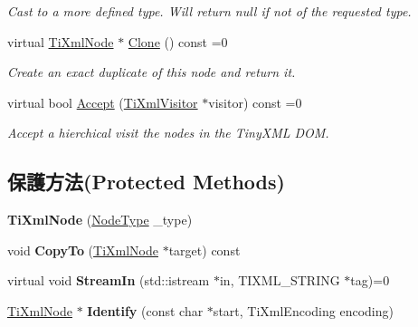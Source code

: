 \begin{DoxyCompactItemize}
\begin{DoxyCompactList}\small\item\em Cast to a more defined type. Will return null if not of the requested type. \end{DoxyCompactList}\item 
virtual \hyperlink{class_ti_xml_node}{Ti\+Xml\+Node} $\ast$ \hyperlink{class_ti_xml_node_abdbb27ef509ba1c5172cbc39fdcb263b}{Clone} () const  =0
\begin{DoxyCompactList}\small\item\em Create an exact duplicate of this node and return it. \end{DoxyCompactList}\item 
virtual bool \hyperlink{class_ti_xml_node_adb1f7da895f8c9e945e6bd406fe34c78}{Accept} (\hyperlink{class_ti_xml_visitor}{Ti\+Xml\+Visitor} $\ast$visitor) const  =0
\begin{DoxyCompactList}\small\item\em Accept a hierchical visit the nodes in the Tiny\+X\+ML D\+OM. \end{DoxyCompactList}\end{DoxyCompactItemize}
\subsection*{保護方法(Protected Methods)}
\begin{DoxyCompactItemize}
\item 
{\bfseries Ti\+Xml\+Node} (\hyperlink{class_ti_xml_node_a836eded4920ab9e9ef28496f48cd95a2}{Node\+Type} \+\_\+type)\hypertarget{class_ti_xml_node_a3f46721695868667113c7487ff123f20}{}\label{class_ti_xml_node_a3f46721695868667113c7487ff123f20}

\item 
void {\bfseries Copy\+To} (\hyperlink{class_ti_xml_node}{Ti\+Xml\+Node} $\ast$target) const \hypertarget{class_ti_xml_node_ab6056978923ad8350fb5164af32d8038}{}\label{class_ti_xml_node_ab6056978923ad8350fb5164af32d8038}

\item 
virtual void {\bfseries Stream\+In} (std\+::istream $\ast$in, T\+I\+X\+M\+L\+\_\+\+S\+T\+R\+I\+NG $\ast$tag)=0\hypertarget{class_ti_xml_node_ab4b4af1a6b486dcbc0e327cf291270af}{}\label{class_ti_xml_node_ab4b4af1a6b486dcbc0e327cf291270af}

\item 
\hyperlink{class_ti_xml_node}{Ti\+Xml\+Node} $\ast$ {\bfseries Identify} (const char $\ast$start, Ti\+Xml\+Encoding encoding)\hypertarget{class_ti_xml_node_ac1e3a8e7578be463b04617786120c2bb}{}\label{class_ti_xml_node_ac1e3a8e7578be463b04617786120c2bb}

\end{DoxyCompactItemize}
